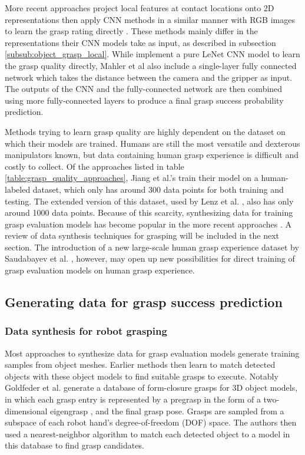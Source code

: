 More recent approaches project local features at contact locations onto 2D representations then apply CNN methods in a
similar manner with RGB images to learn the grasp rating directly \cite{Gualtieri2016,mahler2017,Kappler2015}. These
methods mainly differ in the representations their CNN models take as input, as described in subsection
\ref{subsub:object_grasp_local}. While \cite{Gualtieri2016,Kappler2015} implement a pure LeNet CNN model \cite{Gu2018}
to learn the grasp quality directly, Mahler et al \cite{mahler2017} also include a single-layer fully connected network
which takes the distance between the camera and the gripper as input. The outputs of the CNN and the fully-connected
network are then combined using more fully-connected layers to produce a final grasp success probability prediction.

Methods trying to learn grasp quality are highly dependent on the dataset on which their models are trained. Humans
are still the most versatile and dexterous manipulators known, but data containing human grasp experience is difficult
and costly to collect. Of the approaches listed in table \ref{table:grasp_quality_approaches}, Jiang et al.'s
\cite{jiang2011} train their model on a human-labeled dataset, which only has around 300 data points for both training
and testing. The extended version of this dataset, used by Lenz et al. \cite{lenz2015}, also has only around 1000 data
points. Because of this scarcity, synthesizing data for training grasp evaluation models has become popular in the more
recent approaches \cite{Kappler2015,Gualtieri2016,mahler2017}. A review of data synthesis techniques for grasping will
be included in the next section. The introduction of a new large-scale human grasp experience dataset by Saudabayev et
al. \cite{Saudabayev2018}, however, may open up new possibilities for direct training of grasp evaluation models on
human grasp experience.

\subsection{Generating data for grasp success prediction}

\subsubsection{Data synthesis for robot grasping} \label{subsub:data_synthesis}

Most approaches to synthesize data for grasp evaluation models generate training samples from object meshes. Earlier
methods then learn to match detected objects with these object models to find suitable grasps to execute. Notably
Goldfeder et al. \cite{Goldfeder2009CGDB} generate a database of form-closure grasps for 3D object models, in which
each grasp entry is represented by a pregrasp in the form of a two-dimensional eigengrasp \cite{Ciocarlie2009}, and the
final grasp pose. Grasps are sampled from a subspace of each robot hand's degree-of-freedom (DOF) space. The authors
then used a nearest-neighbor algorithm to match each detected object to a model in this database \cite{Goldfeder2011}
to find grasp candidates.

